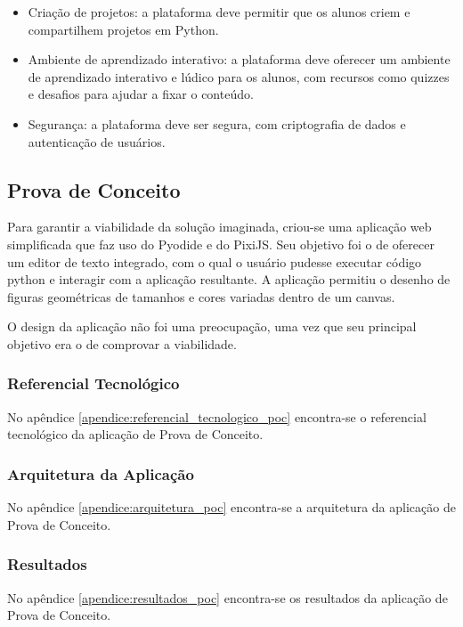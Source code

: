 \begin{itemize}
    \item Criação de projetos: a plataforma deve permitir que os alunos criem e compartilhem projetos em Python.
    \item Ambiente de aprendizado interativo: a plataforma deve oferecer um ambiente de aprendizado interativo e lúdico para os alunos, com recursos como quizzes e desafios para ajudar a fixar o conteúdo.
    \item Segurança: a plataforma deve ser segura, com criptografia de dados e autenticação de usuários.
\end{itemize}

\subsection{Prova de Conceito}

Para garantir a viabilidade da solução imaginada, criou-se uma aplicação web simplificada que faz uso do Pyodide e do PixiJS. Seu objetivo foi o de oferecer um editor de texto integrado, com o qual o usuário pudesse executar código python e interagir com a aplicação resultante. A aplicação permitiu o desenho de figuras geométricas de tamanhos e cores variadas dentro de um canvas.

O design da aplicação não foi uma preocupação, uma vez que seu principal objetivo era o de comprovar a viabilidade.

\subsubsection{Referencial Tecnológico}

No apêndice \ref{apendice:referencial_tecnologico_poc} encontra-se o referencial tecnológico da aplicação de Prova de Conceito.

\subsubsection{Arquitetura da Aplicação}

No apêndice \ref{apendice:arquitetura_poc} encontra-se a arquitetura da aplicação de Prova de Conceito.

\subsubsection{Resultados}

No apêndice \ref{apendice:resultados_poc} encontra-se os resultados da aplicação de Prova de Conceito.


